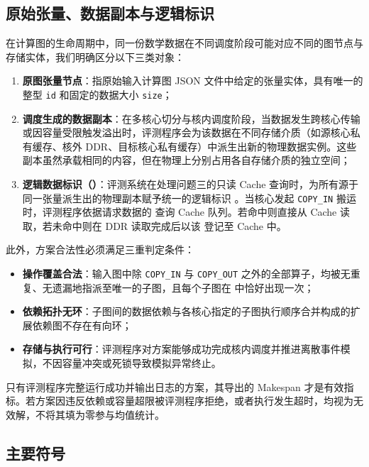 \documentclass[anonymous,withtoc]{gmcm2026}
\providecommand{\tightlist}{\setlength{\itemsep}{0pt}\setlength{\parskip}{0pt}}
\begin{document}
\subsection{原始张量、数据副本与逻辑标识}

在计算图的生命周期中，同一份数学数据在不同调度阶段可能对应不同的图节点与存储实体，我们明确区分以下三类对象：

\begin{enumerate}
\def\labelenumi{\arabic{enumi}.}
\tightlist
\item
  \textbf{原图张量节点}：指原始输入计算图 JSON 文件中给定的张量实体，具有唯一的整型 \texttt{id} 和固定的数据大小 \texttt{size}；
\item
  \textbf{调度生成的数据副本}：在多核心切分与核内调度阶段，当数据发生跨核心传输或因容量受限触发溢出时，评测程序会为该数据在不同存储介质（如源核心私有缓存、核外 DDR、目标核心私有缓存）中派生出新的物理数据实例。这些副本虽然承载相同的内容，但在物理上分别占用各自存储介质的独立空间；
\item
  \textbf{逻辑数据标识（\texttt{}）}：评测系统在处理问题三的只读 Cache 查询时，为所有源于同一张量派生出的物理副本赋予统一的逻辑标识 \texttt{}。当核心发起 \texttt{COPY\_IN} 搬运时，评测程序依据请求数据的 \texttt{} 查询 Cache 队列。若命中则直接从 Cache 读取，若未命中则在 DDR 读取完成后以该 \texttt{} 登记至 Cache 中。
\end{enumerate}

此外，方案合法性必须满足三重判定条件：

\begin{itemize}
\tightlist
\item
  \textbf{操作覆盖合法}：输入图中除 \texttt{COPY\_IN} 与 \texttt{COPY\_OUT} 之外的全部算子，均被无重复、无遗漏地指派至唯一的子图，且每个子图在 \texttt{} 中恰好出现一次；
\item
  \textbf{依赖拓扑无环}：子图间的数据依赖与各核心指定的子图执行顺序合并构成的扩展依赖图不存在有向环；
\item
  \textbf{存储与执行可行}：评测程序对方案能够成功完成核内调度并推进离散事件模拟，不因容量冲突或死锁导致模拟异常终止。
\end{itemize}

只有评测程序完整运行成功并输出日志的方案，其导出的 Makespan 才是有效指标。若方案因违反依赖或容量超限被评测程序拒绝，或者执行发生超时，均视为无效解，不将其填为零参与均值统计。

\subsection{主要符号}
\end{document}
